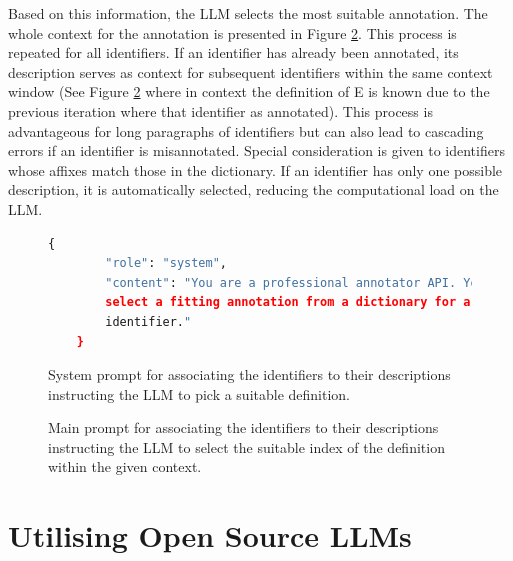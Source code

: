 Based on this information, the LLM selects the most suitable annotation. The whole context for the annotation is presented in Figure \ref{fig:prompt_anno_main}. This process is repeated for all identifiers. If an identifier has already been annotated, its description serves as context for subsequent identifiers within the same context window (See Figure \ref{fig:prompt_anno_main} where in context the definition of E is known due to the previous iteration where that identifier as annotated). This process is advantageous for long paragraphs of identifiers but can also lead to cascading errors if an identifier is misannotated. Special consideration is given to identifiers whose affixes match those in the dictionary. If an identifier has only one possible description, it is automatically selected, reducing the computational load on the LLM.

\begin{figure}[htpb]
  \centering
  \begin{lstlisting}[language=python]
    {
        "role": "system",
        "content": "You are a professional annotator API. Your job is to 
        select a fitting annotation from a dictionary for a mathematical
        identifier."
    }
  \end{lstlisting}
  \caption[System Prompt for Annotation]{System prompt for associating the identifiers to their descriptions instructing the LLM to pick a suitable definition.}\label{fig:prompt_anno_system}
\end{figure}

\begin{figure}[htpb]
  \centering
  \quad 
  \caption[User Prompt for Annotation]{Main prompt for associating the identifiers to their descriptions instructing the LLM to select the suitable index of the definition within the given context.}\label{fig:prompt_anno_main}
\end{figure}

\section{Utilising Open Source LLMs}

